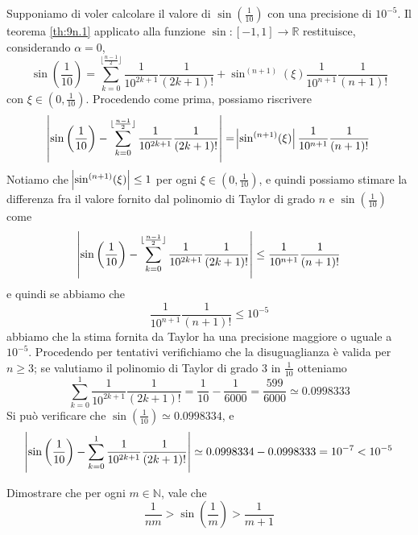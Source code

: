 \begin{example}
    Supponiamo di voler calcolare il valore di $\sin\left(\frac{1}{10}\right)$ con una precisione di $10^{-5}$. Il teorema \ref{th:9n.1} applicato alla funzione $\sin\colon [-1,1]\to\mathbb{R}$ restituisce, considerando $\alpha=0$,
    \[
    \sin\left(\frac{1}{10}\right)=\sum_{k=0}^{\lfloor \frac{n-1}{2}\rfloor} \frac{1}{10^{2k+1}}\frac{1}{(2k+1)!}+\sin^{(n+1)}(\xi)\frac{1}{10^{n+1}}\frac{1}{(n+1)!}
    \]
    con $\xi\in\left(0, \frac{1}{10}\right)$. Procedendo come prima, possiamo riscrivere
    \[
    \abs{\sin\left(\frac{1}{10}\right)-\sum_{k=0}^{\lfloor \frac{n-1}{2}\rfloor} \frac{1}{10^{2k+1}}\frac{1}{(2k+1)!}} = \abs{\sin^{(n+1)}(\xi)}\frac{1}{10^{n+1}}\frac{1}{(n+1)!}
    \]
    Notiamo che $\abs{\sin^{(n+1)}(\xi)}\le 1$ per ogni $\xi\in\left(0,\frac{1}{10}\right)$, e quindi possiamo stimare la differenza fra il valore fornito dal polinomio di Taylor di grado $n$ e $\sin\left(\frac{1}{10}\right)$ come
    \[
    \abs{\sin\left(\frac{1}{10}\right)-\sum_{k=0}^{\lfloor \frac{n-1}{2}\rfloor} \frac{1}{10^{2k+1}}\frac{1}{(2k+1)!}} \le\frac{1}{10^{n+1}}\frac{1}{(n+1)!}
    \]
    e quindi se abbiamo che
    \[
    \frac{1}{10^{n+1}}\frac{1}{(n+1)!} \le 10^{-5}
    \]
    abbiamo che la stima fornita da Taylor ha una precisione maggiore o uguale a $10^{-5}$. Procedendo per tentativi verifichiamo che la disuguaglianza è valida per $n\ge 3$; se valutiamo il polinomio di Taylor di grado $3$ in $\frac{1}{10}$ otteniamo
    \[
    \sum_{k=0}^1 \frac{1}{10^{2k+1}}\frac{1}{(2k+1)!} = \frac{1}{10}-\frac{1}{6000} = \frac{599}{6000}\simeq0.0998333
    \]
    Si può verificare che $\sin\left(\frac{1}{10}\right)\simeq 0.0998334$, e 
    \[
     \abs{\sin\left(\frac{1}{10}\right)-\sum_{k=0}^{1} \frac{1}{10^{2k+1}}\frac{1}{(2k+1)!}} \simeq 0.0998334-0.0998333 = 10^{-7}<10^{-5}
    \]
\end{example}
\begin{exercise}
    \label{ex:9n.1}
    Dimostrare che per ogni $m\in\mathbb{N}$, vale che
    \[
    \frac{1}{nm}>\sin\left(\frac{1}{m}\right)>\frac{1}{m+1}
    \]
\end{exercise}
